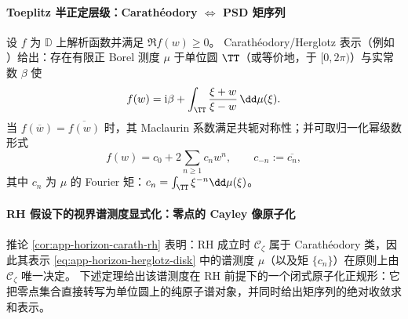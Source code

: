 \paragraph{Toeplitz 半正定层级：Carath\'eodory \texorpdfstring{$\Leftrightarrow$}{<->} PSD 矩序列}
设 \(f\) 为 \(\mathbb{D}\) 上解析函数并满足 \(\Re f(w)\ge 0\)。
Carath\'eodory/Herglotz 表示（例如 \cite{Duren1970TheoryHp,Garnett2007BoundedAnalyticFunctions,Simon2005OPUC1}）给出：存在有限正 Borel 测度 \(\mu\) 于单位圆 \(\TT\)（或等价地，于 \([0,2\pi)\)）与实常数 \(\beta\) 使
\begin{equation}\label{eq:app-horizon-herglotz-disk}
f(w)=\mathrm{i}\beta+\int_{\TT}\frac{\xi+w}{\xi-w}\,\dd\mu(\xi).
\end{equation}
当 \(f(\overline w)=\overline{f(w)}\) 时，其 Maclaurin 系数满足共轭对称性；并可取归一化幂级数形式
\begin{equation}\label{eq:app-horizon-carath-series}
f(w)=c_0+2\sum_{n\ge 1}c_n w^n,\qquad c_{-n}:=\overline{c_n},
\end{equation}
其中 \(c_n\) 为 \(\mu\) 的 Fourier 矩：\(c_n=\int_{\TT}\xi^{-n}\dd\mu(\xi)\)。

\paragraph{RH 假设下的视界谱测度显式化：零点的 Cayley 像原子化}
推论 \ref{cor:app-horizon-carath-rh} 表明：RH 成立时 \(\mathscr{C}_{\zeta}\) 属于 Carath\'eodory 类，因此其表示 \eqref{eq:app-horizon-herglotz-disk} 中的谱测度 \(\mu\)（以及矩 \(\{c_n\}\)）在原则上由 \(\mathscr{C}_{\zeta}\) 唯一决定。
下述定理给出该谱测度在 RH 前提下的一个闭式原子化正规形：它把零点集合直接转写为单位圆上的纯原子谱对象，并同时给出矩序列的绝对收敛求和表示。

